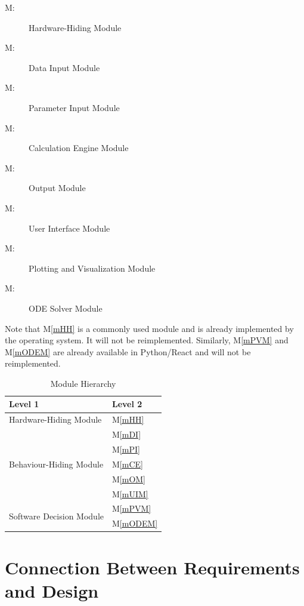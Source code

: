 \documentclass[12pt, titlepage]{article}
\newcounter{mnum}
\newcommand{\mthemnum}{M\themnum}
\newcommand{\mref}[1]{M\ref{#1}}
\begin{document}
\begin{description}
\item [ \mthemnum \label{mHH}:] Hardware-Hiding Module
\item [ \mthemnum \label{mDI}:] Data Input Module
\item [ \mthemnum \label{mPI}:] Parameter Input Module
\item [ \mthemnum \label{mCE}:] Calculation Engine Module
\item [ \mthemnum \label{mOM}:] Output Module
\item [ \mthemnum \label{mUIM}:] User Interface Module
\item [ \mthemnum \label{mPVM}:] Plotting and Visualization Module
\item [ \mthemnum \label{mODEM}:] ODE Solver Module
\end{description}

Note that \mref{mHH} is a commonly used module and is already implemented by the operating system.  It will not be reimplemented.  Similarly, \mref{mPVM} and  \mref{mODEM} are already available in Python/React and will not be reimplemented.


\begin{table}[h!]
\centering
\begin{tabular}{p{} p{}}
\toprule
\textbf{Level 1} & \textbf{Level 2}\\
\midrule

{Hardware-Hiding Module} & \mref{mHH} \\
\midrule

\multirow{5}{0.3\textwidth}{Behaviour-Hiding Module} & \mref{mDI}\\
& \mref{mPI}\\
& \mref{mCE}\\
& \mref{mOM}\\
& \mref{mUIM}\\
\midrule

\multirow{2}{0.3\textwidth}{Software Decision Module} & \mref{mPVM}\\
& \mref{mODEM}\\
\bottomrule

\end{tabular}
\caption{Module Hierarchy}
\label{TblMH}
\end{table}

\section{Connection Between Requirements and Design} \label{SecConnection}
\end{document}
